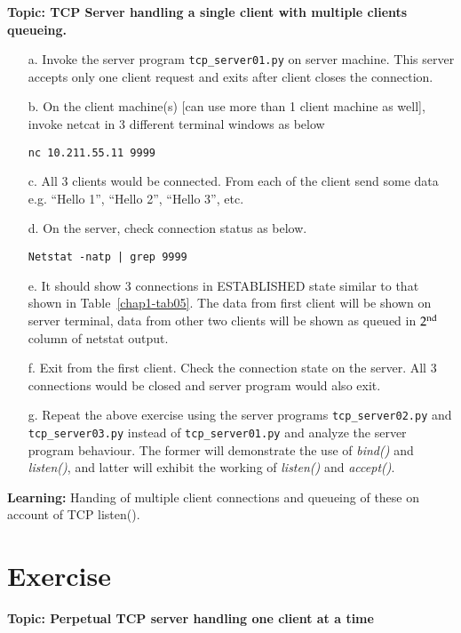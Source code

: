 \begin{multicols}{2}
\textbf{Topic: TCP Server handling a single client with multiple clients queueing.}

\begin{itemize}
\item[a.] Invoke the server program \texttt{tcp\_server01.py} on server machine. This server accepts only one client request and exits after client closes the connection.

\item[b.] On the client machine(s) [can use more than 1 client machine as well], invoke netcat in 3 different terminal windows as below

\texttt{nc 10.211.55.11 9999}

\item[c.] All 3 clients would be connected. From each of the client send some data e.g. “Hello 1”, “Hello 2”, “Hello 3”, etc.

\item[d.] On the server, check connection status as below. 

\texttt{Netstat -natp | grep 9999}

\item[e.] It should show 3 connections in ESTABLISHED state similar to that shown in Table~\ref{chap1-tab05}. The data from first client will be shown on server terminal, data from other two clients will be shown as queued in $2^{\rm nd}$ column of netstat output.
\item[f.] Exit from the first client. Check the connection state on the server. All 3 connections would be closed and server program would also exit.
\item[g.] Repeat the above exercise using the server programs \texttt{tcp\_server02.py} and \texttt{tcp\_server03.py} instead of \texttt{tcp\_server01.py} and analyze the server program behaviour. The former will demonstrate the use of \textit{bind()} and \textit{listen()}, and latter will exhibit the working of \textit{listen()} and \textit{accept()}.
\end{itemize}

\textbf{Learning:} Handing of multiple client connections and queueing of these on account of TCP listen().

\section*{Exercise \label{chap1-exe02}}

\textbf{Topic: Perpetual TCP server handling one client at a time}


\end{multicols}
